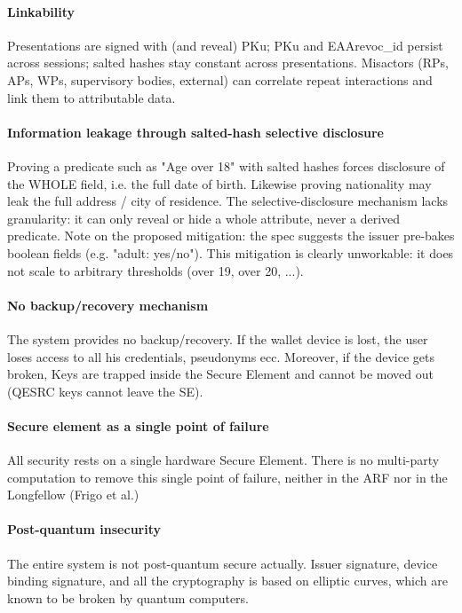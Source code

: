 \documentclass[binding=0.6cm,oneside,noexaminfo]{sapthesis}
\begin{document}
\paragraph{Linkability}
Presentations are signed with (and reveal) PKu; PKu and EAArevoc\_id persist
across sessions; salted hashes stay constant across presentations. Misactors
(RPs, APs, WPs, supervisory bodies, external) can correlate repeat
interactions and link them to attributable data.

\paragraph{Information leakage through salted-hash selective disclosure}
Proving a predicate such as "Age over 18" with salted hashes forces disclosure 
of the WHOLE field, i.e. the full date of birth. 
Likewise proving nationality may leak the full address / city of
residence. The selective-disclosure mechanism lacks granularity: it can only
reveal or hide a whole attribute, never a derived predicate.
Note on the proposed mitigation: the spec suggests the issuer pre-bakes
boolean fields (e.g. "adult: yes/no"). This mitigation is clearly unworkable: 
it does not scale to arbitrary thresholds (over 19, over 20, ...).

\paragraph{No backup/recovery mechanism}
The system provides no backup/recovery. If the wallet device is
lost, the user loses access to all his credentials, pseudonyms ecc. 
Moreover, if the device gets broken, Keys are trapped inside the 
Secure Element and cannot be moved out (QESRC keys cannot leave the SE).

\paragraph{Secure element as a single point of failure}
All security rests on a single hardware Secure Element. There is
no multi-party computation to remove this single point of failure, neither in
the ARF nor in the Longfellow (Frigo et al.)

\paragraph{Post-quantum insecurity}
The entire system is not post-quantum secure actually. Issuer signature, device
binding signature, and all the cryptography is based on elliptic curves, 
which are known to be broken by quantum computers.
\end{document}
